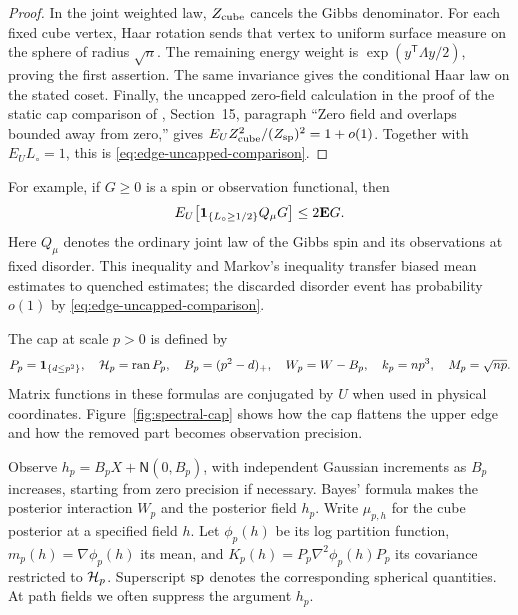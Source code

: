\begin{proof}
In the joint weighted law, $Z_{\rm cube}$ cancels the Gibbs denominator.
For each fixed cube vertex, Haar rotation sends that vertex to uniform
surface measure on the sphere of radius $\sqrt n$.  The remaining energy
weight is $\exp(y^{\mathsf T}\Lambda y/2)$, proving the first assertion.
The same invariance gives the conditional Haar law on the stated coset.
Finally, the uncapped zero-field calculation in the proof of the static
cap comparison of \cite{CM}, Section~15, paragraph ``Zero field and
overlaps bounded away from zero,'' gives
$E_UZ_{\rm cube}^2/(Z_{\rm sp})^2=1+o(1)$.
Together with $E_UL_\circ=1$, this is
\eqref{eq:edge-uncapped-comparison}.
\end{proof}

For example, if $G\ge0$ is a spin or observation functional, then
\[
 E_U\!\left[\mathbf 1_{\{L_\circ\ge1/2\}}Q_\mu G\right]
       \le2\mathbf E G.
\]
Here $Q_\mu$ denotes the ordinary joint law of the Gibbs spin and its
observations at fixed disorder.  This inequality and Markov's inequality
transfer biased mean estimates to quenched estimates; the discarded disorder
event has probability $o(1)$ by \eqref{eq:edge-uncapped-comparison}.

The cap at scale $p>0$ is defined by
\[
 P_p=\mathbf 1_{\{d\le p^2\}},\quad \mathcal H_p=\operatorname{ran}P_p,\quad
 B_p=(p^2-d)_+,\quad W_p=W-B_p,\quad k_p=np^3,\quad M_p=\sqrt{np}.
\]
Matrix functions in these formulas are conjugated by $U$ when used in
physical coordinates.  Figure~\ref{fig:spectral-cap} shows how the cap
flattens the upper edge and how the removed part becomes observation precision.


Observe
$h_p=B_pX+\mathsf N(0,B_p)$, with independent Gaussian increments as
$B_p$ increases, starting from zero precision if necessary.  Bayes' formula
makes the posterior interaction $W_p$ and the posterior field $h_p$.
Write $\mu_{p,h}$ for the cube posterior at a specified field $h$.  Let $\phi_p(h)$ be its log partition function,
$m_p(h)=\nabla\phi_p(h)$ its mean, and
$K_p(h)=P_p\nabla^2\phi_p(h)P_p$ its covariance restricted to $\mathcal H_p$.
Superscript ${\rm sp}$ denotes the corresponding spherical quantities.
At path fields we often suppress the argument $h_p$.

